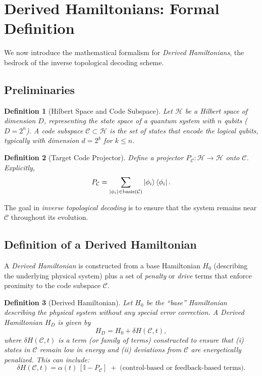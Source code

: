 \documentclass[11pt]{article}
\newtheorem{definition}{Definition}[section]
\begin{document}
\section{Derived Hamiltonians: Formal Definition}
\label{sec:derived-hamiltonians}

We now introduce the mathematical formalism for \emph{Derived Hamiltonians}, the bedrock of the inverse topological decoding scheme.

\subsection{Preliminaries}

\begin{definition}[Hilbert Space and Code Subspace]
Let $\mathcal{H}$ be a Hilbert space of dimension $D$, representing the state space of a quantum system with $n$ qubits ($D = 2^n$). A \emph{code subspace} $\mathcal{C} \subset \mathcal{H}$ is the set of states that encode the logical qubits, typically with dimension $d = 2^k$ for $k \le n$.
\end{definition}

\begin{definition}[Target Code Projector]
Define a projector $P_{\mathcal{C}}: \mathcal{H} \to \mathcal{H}$ onto $\mathcal{C}$. Explicitly,
\begin{equation}
    P_{\mathcal{C}} = \sum_{\ket{\phi_i} \in \text{basis}(\mathcal{C})} 
    \ket{\phi_i}\bra{\phi_i}.
\end{equation}
\end{definition}

The goal in \emph{inverse topological decoding} is to ensure that the system remains near $\mathcal{C}$ throughout its evolution.

\subsection{Definition of a Derived Hamiltonian}
A \emph{Derived Hamiltonian} is constructed from a base Hamiltonian $H_0$ (describing the underlying physical system) plus a set of \emph{penalty} or \emph{drive} terms that enforce proximity to the code subspace $\mathcal{C}$.

\begin{definition}[Derived Hamiltonian]
\label{def:DerivedHamiltonian}
Let $H_0$ be the ``base'' Hamiltonian describing the physical system without any special error correction. A \emph{Derived Hamiltonian} $H_D$ is given by
\begin{equation}
    H_D = H_0 + \delta H(\mathcal{C}, t),
\end{equation}
where $\delta H(\mathcal{C}, t)$ is a term (or family of terms) constructed to ensure that (i) states in $\mathcal{C}$ remain low in energy and (ii) deviations from $\mathcal{C}$ are energetically penalized. This can include:
\[
\delta H(\mathcal{C}, t) = \alpha(t) \, [\mathbb{I} - P_{\mathcal{C}}] 
\;+\;
\text{(control-based or feedback-based terms)}.
\]
\end{definition}
\end{document}
